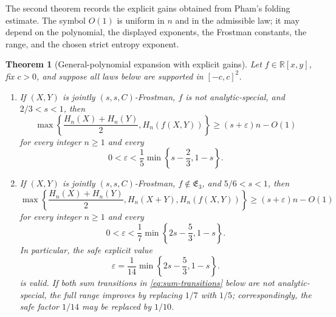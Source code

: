 \documentclass[11pt]{article}
\newtheorem{theorem}{Theorem}[section]
\begin{document}
The second theorem records the explicit gains obtained from Pham's
folding estimate.  The symbol \(O(1)\) is uniform in \(n\) and in the
admissible law; it may depend on the polynomial, the displayed
exponents, the Frostman constants, the range, and the chosen strict
entropy exponent.

\begin{theorem}[General-polynomial expansion with explicit gains]
\label{thm:Pham-explicit}
Let \(f\in\mathbb R[x,y]\), fix \(c>0\), and suppose all laws below are
supported in \([-c,c]^2\).
\begin{enumerate}[label=\textup{(\roman*)}]
\item If \((X,Y)\) is jointly \((s,s,C)\)-Frostman, \(f\) is not
analytic-special, and \(2/3<s<1\), then
\[
 \max\left\{\frac{H_n(X)+H_n(Y)}{2},H_n(f(X,Y))\right\}
 \ge(s+\varepsilon)n-O(1)
\]
for every integer \(n\ge1\) and every
\[
 0<\varepsilon<\frac{1}{5}\min\left\{s-\frac{2}{3},1-s\right\}.
\]

\item If \((X,Y)\) is jointly \((s,s,C)\)-Frostman,
\(f\notin\mathfrak E_3\), and \(5/6<s<1\), then
\begin{equation}
 \max\left\{\frac{H_n(X)+H_n(Y)}{2},H_n(X+Y),
 H_n(f(X,Y))\right\}
 \ge(s+\varepsilon)n-O(1)
 \label{eq:Pham-joint-main}
\end{equation}
for every integer \(n\ge1\) and every
\[
 0<\varepsilon<\frac{1}{7}
 \min\left\{2s-\frac{5}{3},1-s\right\}.
\]
In particular, the safe explicit value
\begin{equation}
 \varepsilon=\frac{1}{14}
 \min\left\{2s-\frac{5}{3},1-s\right\}.
 \label{eq:Pham-joint-eps}
\end{equation}
is valid.  If both sum transitions in
\eqref{eq:sum-transitions} below are not analytic-special, the full
range improves by replacing \(1/7\) with \(1/5\); correspondingly,
the safe factor \(1/14\) may be replaced by \(1/10\).


\end{enumerate}
\end{theorem}
\end{document}
